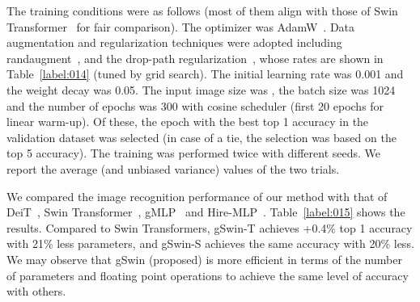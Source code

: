 \documentclass{article}
\begin{document}
The training conditions were as follows (most of them align with those of Swin Transformer~\citep{liu2021swin} for fair comparison).
The optimizer was AdamW~\citep{kingma2014adam}.
Data augmentation and regularization techniques
were adopted including 
randaugment~\citep{cubuk2020randaugment,rw2019timm},
and the drop-path regularization~\citep{larsson2016fractalnet}, whose rates are shown in Table~\ref{label:014} (tuned by grid search).
The initial learning rate was 0.001 and the weight decay was 0.05.
The input image size was , the batch size was 1024 and the number of epochs was 300 with cosine scheduler (first 20 epochs for linear warm-up).
Of these, the epoch with the best top 1 accuracy in the validation dataset was selected (in case of a tie, the selection was based on the top 5 accuracy). The training was performed twice with different seeds. We report the average (and unbiased variance) values of the two trials.

We compared the image recognition performance of our method with that of DeiT~\citep{touvron2021training}, Swin Transformer~\citep{liu2021swin}, gMLP~\citep{liu2021pay}
and Hire-MLP~\citep{guo2021hire}.
Table~\ref{label:015} shows the results.
Compared to Swin Transformers, gSwin-T achieves +0.4\% top 1 accuracy with 21\% less parameters, and gSwin-S achieves the same accuracy with 20\% less.
We may observe that gSwin (proposed) is more efficient in terms of the number of parameters and floating point operations to achieve the same level of accuracy with others.
\end{document}

